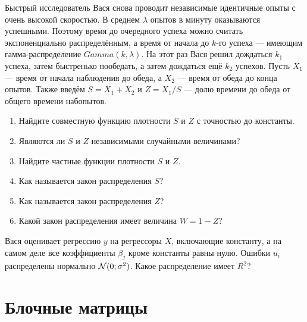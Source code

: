 \begin{problem}
    Быстрый исследователь Вася снова проводит независимые идентичные опыты с очень высокой скоростью. В среднем $\lambda$ опытов в минуту оказываются успешными. Поэтому время до очередного успеха можно считать экспоненциально распределённым, а время от начала до $k$-го успеха — имеющим гамма-распределение $Gamma(k, \lambda)$. На этот раз Вася решил дождаться $k_1$ успеха, затем быстренько пообедать, а затем дождаться ещё $k_2$ успехов. Пусть $X_1$ — время от начала наблюдения до обеда, а $X_2$ — время от обеда до конца опытов. Также введём $S=X_1 + X_2$ и $Z = X_1 / S$ — долю времени до обеда от общего времени набопытов.

\begin{enumerate}
    \item Найдите совместную функцию плотности $S$ и $Z$ с точностью до константы.
    \item Являются ли $S$ и $Z$ независимыми случайными величинами?
    \item Найдите частные функции плотности $S$ и $Z$.
    \item Как называется закон распределения $S$?
        \item Как называется закон распределения $Z$?
    \item Какой закон распределения имеет величина $W = 1 - Z$?
\end{enumerate}

\begin{sol}
\end{sol}
\end{problem}




\begin{problem}
    Вася оценивает регрессию $y$ на регрессоры $X$, включающие константу, 
    а на самом деле все коэффициенты $\beta_j$ кроме константы равны нулю. 
    Ошибки $u_i$ распределены нормально $\mathcal{N}(0;\sigma^2)$. Какое распределение имеет $R^2$?
\begin{sol}
\end{sol}
\end{problem}






\section{Блочные матрицы}

